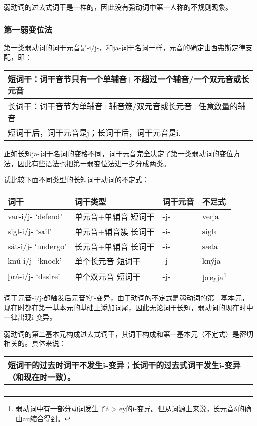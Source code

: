 弱动词的过去式词干是一样的，因此没有强动词中第一人称的不规则现象。

\subsubsection{第一弱变位法}\label{ux7b2cux4e00ux5f31ux53d8ux4f4dux6cd5}

第一类弱动词的词干元音是-i/j-，和ja-词干名词一样，元音的确定由西弗斯定律支配，即：

\begin{longtable}{l}
\toprule
短词干：词干音节只有一个单辅音+不超过一个辅音/一个双元音或长元音 \\
\midrule
\endhead
\bottomrule
\endfoot
长词干：词干音节为单辅音+辅音簇/双元音或长元音+任意数量的辅音 \\
短词干后，词干元音是j；长词干后，词干元音是i. \\
\end{longtable}

正如长短ja-词干名词的变格不同，词干元音完全决定了第一类弱动词的变位方法，因此有些语法也把第一弱变位法进一步分成两类。

试比较下面不同类型的长短词干动词的不定式：

\begin{longtable}{llll}
\toprule
词干 & 词干类型 & 词干元音 & 不定式 \\
\midrule
\endhead
\bottomrule
\endfoot
var-i/j- `defend‌' & 单元音+单辅音 短词干 & -j- & verja \\
sigl-i/j- `sail‌' & 单元音+辅音簇 长词干 & -i- & sigla \\
sát-i/j- `undergo‌' & 长元音+单辅音 长词干 & -i- & sæta \\
knú-i/j- `knock' & 单个长元音 短词干 & -j- & knýja \\
þrá-i/j- `desire' & 单个双元音 短词干 & -j- & þreyja\footnote{弱动词中有一部分动词发生了á
  \textgreater{} ey的i-变异。但从词源上来说，长元音á的确由au缩合得到。} \\
\end{longtable}

词干元音-i/j-都触发后元音的i-变异，由于动词的不定式是弱动词的第一基本元，现在时都在第一基本元的基础上添加词尾，因此无论词干长短，弱动词的现在时中一律出现i-变异。

弱动词的第二基本元构成过去式词干，其词干构成和第一基本元（不定式）是密切相关的。具体来说：

\begin{longtable}{l}
\toprule
短词干的过去时词干不发生i-变异；长词干的过去式词干发生i-变异（和现在时一致）。 \\
\midrule
\endhead
\bottomrule
\endfoot
\end{longtable}

